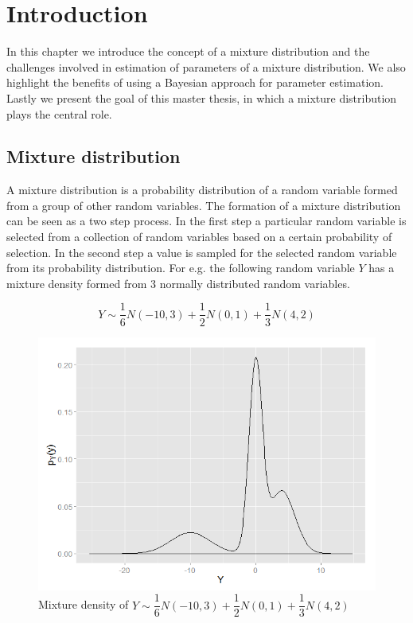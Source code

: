 
\chapter{Introduction}
\label{ch : introduction}

In this chapter we introduce the concept of a mixture distribution and the challenges involved in estimation of parameters of a mixture distribution. We also highlight the benefits of using a Bayesian approach for parameter estimation. Lastly we present the goal of this master thesis, in which a mixture distribution plays the central role.

\section{Mixture distribution}
\label{sec : mixture_distribution}
A mixture distribution is a probability distribution of a random variable formed from a group of other random variables. The formation of a mixture distribution can be seen as a two step process. In the first step a particular random variable is selected from a collection of random variables based on a certain probability of selection. In the second step a value is sampled for the selected random variable from its probability distribution. For e.g. the following random variable $Y$ has a mixture density formed from 3 normally distributed random variables.

$$Y \sim \dfrac{1}{6}N(-10,3) + \dfrac{1}{2}N(0,1) + \dfrac{1}{3}N(4,2)$$

\begin{figure}
	\centering
	\captionsetup{justification=centering}
	\includegraphics[scale=0.5]{mainmatter/chapter_1_introduction/mixture_density.png}
	\caption{Mixture density of $Y \sim \dfrac{1}{6}N(-10,3) + \dfrac{1}{2}N(0,1) + \dfrac{1}{3}N(4,2)$}
	\label{fig : mixture_density_1}
\end{figure}

